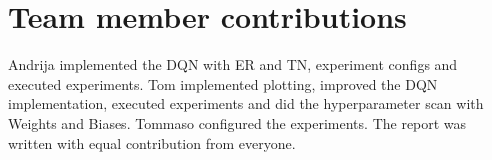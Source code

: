 \documentclass{article}
\begin{document}
\section{Team member contributions}
Andrija implemented the DQN with ER and TN, experiment configs and executed experiments. %
Tom implemented plotting, improved the DQN implementation, executed experiments and did the hyperparameter scan with Weights and Biases.
Tommaso configured the experiments. %
The report was written with equal contribution from everyone.
\end{document}
